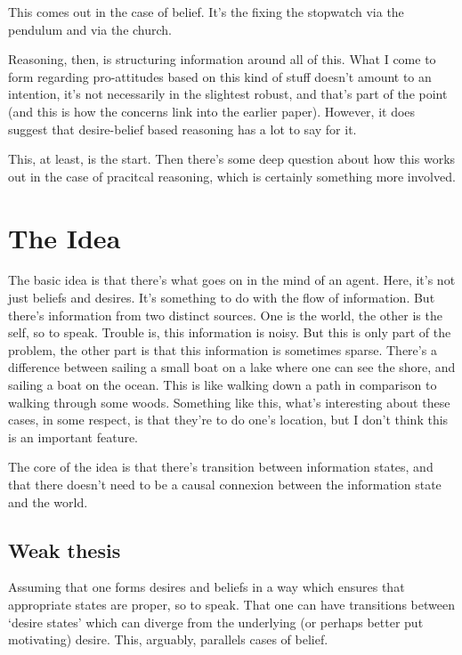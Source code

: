 \documentclass[10pt]{article}
\begin{document}
This comes out in the case of belief.
It's the fixing the stopwatch via the pendulum and via the church.

Reasoning, then, is structuring information around all of this.
What I come to form regarding pro-attitudes based on this kind of stuff doesn't amount to an intention, it's not necessarily in the slightest robust, and that's part of the point (and this is how the concerns link into the earlier paper).
However, it does suggest that desire-belief based reasoning has a lot to say for it.

This, at least, is the start.
Then there's some deep question about how this works out in the case of pracitcal reasoning, which is certainly something more involved.

\section{The Idea}
\label{sec:idea}

The basic idea is that there's what goes on in the mind of an agent.
Here, it's not just beliefs and desires.
It's something to do with the flow of information.
But there's information from two distinct sources.
One is the world, the other is the self, so to speak.
Trouble is, this information is noisy.
But this is only part of the problem, the other part is that this information is sometimes sparse.
There's a difference between sailing a small boat on a lake where one can see the shore, and sailing a boat on the ocean.
This is like walking down a path in comparison to walking through some woods.
Something like this, what's interesting about these cases, in some respect, is that they're to do one's location, but I don't think this is an important feature.


The core of the idea is that there's transition between information states, and that there doesn't need to be a causal connexion between the information state and the world.


\subsection{Weak thesis}
\label{sec:weak-thesis}

Assuming that one forms desires and beliefs in a way which ensures that appropriate states are proper, so to speak.
That one can have transitions between `desire states' which can diverge from the underlying (or perhaps better put motivating) desire.
This, arguably, parallels cases of belief.
\end{document}
